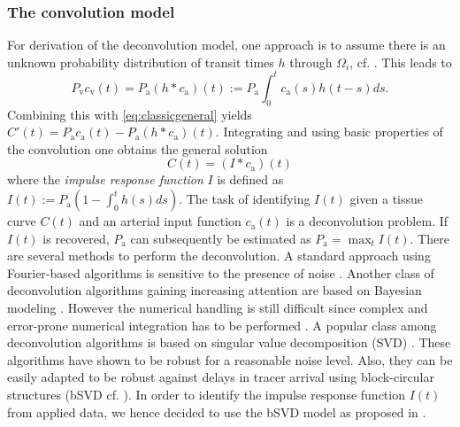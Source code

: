 \documentclass[10pt]{article}
\begin{document}
	\subsubsection{The convolution model}\label{sec:conv}
	For derivation of the deconvolution model, one approach is to assume there is an unknown probability distribution of transit times $h$ through $\Omega_i$, cf. \cite{sourbron13}. 
	This leads to
	\begin{equation}
		P_{\mathrm{v}}c_{\mathrm{v}}(t) = P_{\mathrm{a}}(h\ast c_\mathrm{a})(t) := P_{\mathrm{a}}\int_0^t c_\mathrm{a}(s) h(t-s) d s.
	\end{equation}
	Combining this with \eqref{eq:classicgeneral} yields $C'(t) = P_{\mathrm{a}}c_\mathrm{a}(t)-P_{\mathrm{a}} (h\ast c_\mathrm{a})(t)$.
	Integrating and using basic properties of the convolution one obtains the general solution
	\begin{equation}
		C(t) = (I\ast c_\mathrm{a})(t)
		\label{eq:conv}
	\end{equation}
	where the \emph{impulse response function} $I$ is defined as $I(t) := P_{\mathrm{a}}(1-\int_0^t h(s) d s)$.
	The task of identifying $I(t)$ given a tissue curve $C(t)$ and an arterial input function $c_\mathrm{a}(t)$ is a deconvolution problem.
	If $I(t)$ is recovered, $P_{\mathrm{a}}$ can subsequently be estimated as $P_{\mathrm{a}} = \max_{t} I(t)$.
	There are several methods to perform the deconvolution.
	A standard approach using Fourier-based algorithms is sensitive to the presence of noise \cite{ostergaard96}.
	Another class of deconvolution algorithms gaining increasing attention are based on Bayesian modeling \cite{boutelier12}.
	However the numerical handling is still difficult since complex and error-prone numerical integration has to be performed \cite{boutelier12}.
	A popular class among deconvolution algorithms is based on singular value decomposition (SVD) \cite{ostergaard96}.
	These algorithms have shown to be robust for a reasonable noise level.
	Also, they can be easily adapted to be robust against delays in tracer arrival using block-circular structures (bSVD cf. \cite{wu03}).
	In order to identify the impulse response function $I(t)$ from applied data, we hence decided to use the bSVD model as proposed in \cite{wu03}.

	
	
\end{document}
